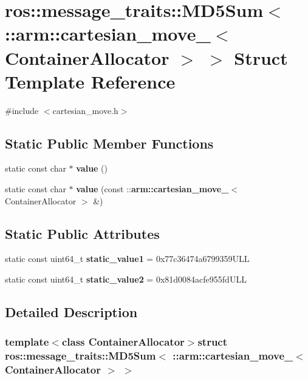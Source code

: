 \section{ros\-:\-:message\-\_\-traits\-:\-:\-M\-D5\-Sum$<$ \-:\-:arm\-:\-:cartesian\-\_\-move\-\_\-$<$ \-Container\-Allocator $>$ $>$ \-Struct \-Template \-Reference}
\label{structros_1_1message__traits_1_1MD5Sum_3_01_1_1arm_1_1cartesian__move___3_01ContainerAllocator_01_4_01_4}


{\ttfamily \#include $<$cartesian\-\_\-move.\-h$>$}

\subsection*{\-Static \-Public \-Member \-Functions}
\begin{DoxyCompactItemize}
\item 
static const char $\ast$ {\bf value} ()
\item 
static const char $\ast$ {\bf value} (const \-::{\bf arm\-::cartesian\-\_\-move\-\_\-}$<$ \-Container\-Allocator $>$ \&)
\end{DoxyCompactItemize}
\subsection*{\-Static \-Public \-Attributes}
\begin{DoxyCompactItemize}
\item 
static const uint64\-\_\-t {\bf static\-\_\-value1} = 0x77c36474a6799359\-U\-L\-L
\item 
static const uint64\-\_\-t {\bf static\-\_\-value2} = 0x81d0084acfe955fd\-U\-L\-L
\end{DoxyCompactItemize}


\subsection{\-Detailed \-Description}
\subsubsection*{template$<$class Container\-Allocator$>$struct ros\-::message\-\_\-traits\-::\-M\-D5\-Sum$<$ \-::arm\-::cartesian\-\_\-move\-\_\-$<$ Container\-Allocator $>$ $>$}



